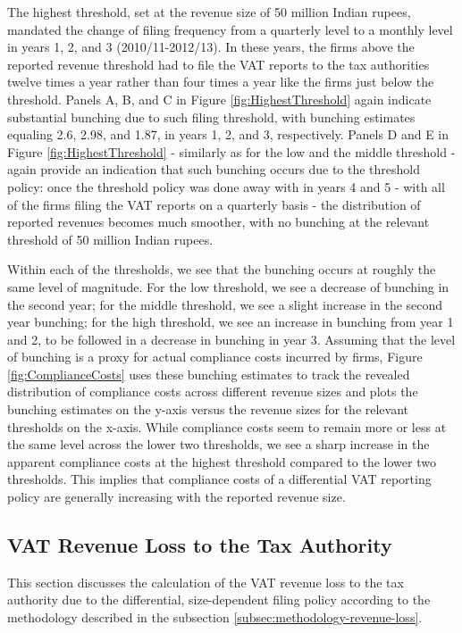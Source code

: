The highest threshold, set at the revenue size of 50 million Indian
rupees, mandated the change of filing frequency from a quarterly level
to a monthly level in years 1, 2, and 3 (2010/11-2012/13). In these
years, the firms above the reported revenue threshold had to file
the VAT reports to the tax authorities twelve times a year rather
than four times a year like the firms just below the threshold. Panels
A, B, and C in Figure \ref{fig:HighestThreshold} again indicate substantial
bunching due to such filing threshold, with bunching estimates equaling
2.6, 2.98, and 1.87, in years 1, 2, and 3, respectively. Panels D
and E in Figure \ref{fig:HighestThreshold} - similarly as for the
low and the middle threshold - again provide an indication that such
bunching occurs due to the threshold policy: once the threshold policy
was done away with in years 4 and 5 - with all of the firms filing
the VAT reports on a quarterly basis - the distribution of reported
revenues becomes much smoother, with no bunching at the relevant threshold
of 50 million Indian rupees.

Within each of the thresholds, we see that the bunching occurs at
roughly the same level of magnitude. For the low threshold, we see
a decrease of bunching in the second year; for the middle threshold,
we see a slight increase in the second year bunching; for the high
threshold, we see an increase in bunching from year 1 and 2, to be
followed in a decrease in bunching in year 3. Assuming that the level
of bunching is a proxy for actual compliance costs incurred by firms,
Figure \ref{fig:ComplianceCosts} uses these bunching estimates to
track the revealed distribution of compliance costs across different
revenue sizes and plots the bunching estimates on the y-axis versus
the revenue sizes for the relevant thresholds on the x-axis. While
compliance costs seem to remain more or less at the same level across
the lower two thresholds, we see a sharp increase in the apparent
compliance costs at the highest threshold compared to the lower two
thresholds. This implies that compliance costs of a differential VAT
reporting policy are generally increasing with the reported revenue
size.

\subsection{VAT Revenue Loss to the Tax Authority}
\label{subsec:results-revenue-loss}
This section discusses the calculation of the VAT revenue loss to
the tax authority due to the differential, size-dependent filing policy
according to the methodology described in the subsection \cref{subsec:methodology-revenue-loss}.

